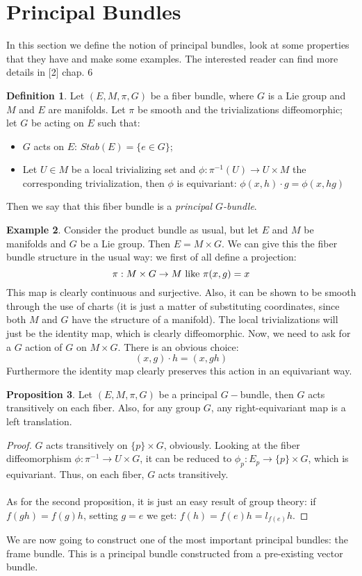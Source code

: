 \documentclass[12pt,a4paper]{report}
\theoremstyle{definition}
\newtheorem{Def}{Definition}[chapter]
\theoremstyle{Theorem}
\newtheorem{Prop}[Def]{Proposition}
\theoremstyle{definition}
\newtheorem{Ex}[Def]{Example}
\theoremstyle{definition}
\begin{document}
	\section{Principal Bundles}
	In this section we define the notion of principal bundles, look at some properties that they have and make some examples. The interested reader can find more details in [2] chap. 6
	\begin{Def}
		Let $(E,M,\pi,G)$ be a fiber bundle, where $G$ is a Lie group and $M$ and $E$ are manifolds. Let $\pi$ be smooth and the trivializations diffeomorphic; let $G$ be acting on $E$ such that:
		\begin{itemize}
			\item $G$ acts on $E$: $Stab(E)=\{e\in G\}$;
			\item Let $U\in M$ be a local trivializing set and $\phi:\pi^{-1}(U)\rightarrow U\times M$  the corresponding trivialization, then $\phi$ is equivariant: $\phi(x,h)\cdot g=\phi(x,hg)$
		\end{itemize} 
		Then we say that this fiber bundle is a \textit{principal $G$-bundle}.
	\end{Def}
	\begin{Ex}
		Consider the product bundle as usual, but let $E$ and $M$ be manifolds and $G$ be a Lie group. Then $E=M\times G$. We can give this the fiber bundle structure in the usual way: we first of all define a projection:
		$$\pi:M\times G\rightarrow M\hbox{ like }\pi(x,g)=x$$
		This map is clearly continuous and surjective. Also, it can be shown to be smooth through the use of charts (it is just a matter of substituting coordinates, since both $M$ and $G$ have the structure of a manifold). The local trivializations will just be the identity map, which is clearly diffeomorphic. Now, we need to ask for a $G$ action of $G$ on $M\times G$. There is an obvious choice:
		$$(x,g)\cdot h=(x,gh)$$
		Furthermore the identity map clearly preserves this action in an equivariant way.
	\end{Ex}
	\begin{Prop}
		Let $(E,M,\pi,G)$ be a principal $G-$bundle, then $G$ acts transitively on each fiber. Also, for any group $G$, any right-equivariant map is a left translation.
	\end{Prop}
	\begin{proof}
		$G$ acts transitively on $\{p\} \times G$, obviously. Looking at the fiber diffeomorphism $\phi:\pi^{-1}\rightarrow U\times G$, it can be reduced to $\phi_p:E_p\rightarrow \{p\}\times G$, which is equivariant. Thus, on each fiber, $G$ acts transitively.\\
		\\
		As for the second proposition, it is just an easy result of group theory: if $f(gh)=f(g)h$, setting $g=e$ we get: $f(h)=f(e)h=l_{f(e)}h$.
	\end{proof}
	We are now going to construct one of the most important principal bundles: the frame bundle. This is a principal bundle constructed from a pre-existing vector bundle.
\end{document}
